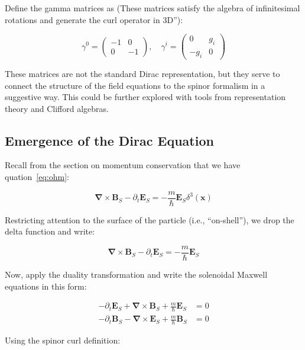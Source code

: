 \documentclass {article}
\renewcommand\vec{\mathbf}
\let\OldS\nabla
\renewcommand{\nabla}{\boldsymbol{\OldS}}
\begin{document}
Define the gamma matrices as (These matrices satisfy the algebra of infinitesimal rotations and generate the curl operator in 3D”):

\begin{equation}
\gamma^0 = \begin{pmatrix}
-1 & 0 \\
0 & -1
\end{pmatrix}, \quad
\gamma^i = \begin{pmatrix}
0 & g_i \\
-g_i & 0
\end{pmatrix}
\end{equation}

These matrices are not the standard Dirac representation, but they serve to connect the structure of the field equations to the spinor formalism in a suggestive way. This could be further explored with tools from representation theory and Clifford algebras.

\subsection{Emergence of the Dirac Equation}

Recall from the section on momentum conservation that we have quation~\eqref{eq:ohm}:

\begin{equation}
\nabla \times \vec{B}_S - \partial_t \vec{E}_S = -\frac{m}{\hbar} \vec{E}_S \delta^3(\vec{x})
\end{equation}

Restricting attention to the surface of the particle (i.e., “on-shell”), we drop the delta function and write:

\begin{equation}
\nabla \times \vec{B}_S - \partial_t \vec{E}_S = -\frac{m}{\hbar} \vec{E}_S
\end{equation}

Now, apply the duality transformation and write the solenoidal Maxwell equations in this form:

\begin{equation}
\begin{aligned}
-\partial_t \vec{E}_S + \nabla \times \vec{B}_S + \frac{m}{\hbar} \vec{E}_S &= 0 \\
-\partial_t \vec{B}_S - \nabla \times \vec{E}_S + \frac{m}{\hbar} \vec{B}_S &= 0
\end{aligned}
\end{equation}

Using the spinor curl definition:
\end{document}
